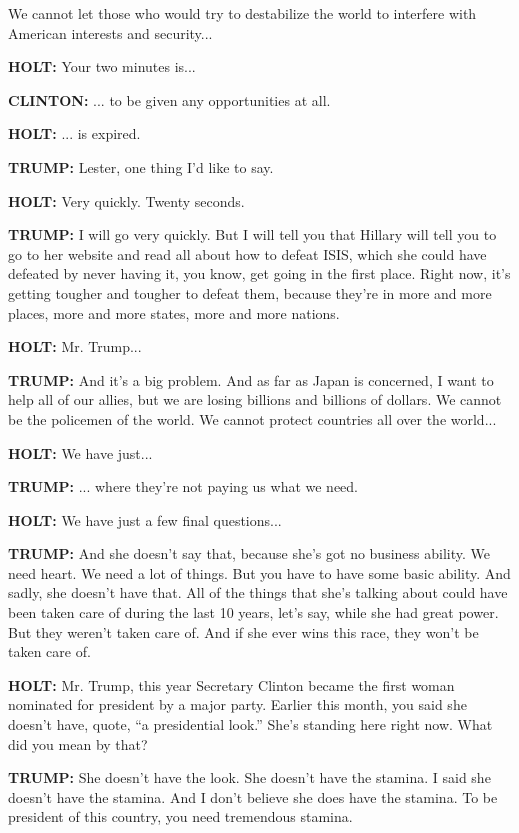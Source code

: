 We cannot let those who would try to destabilize the world to interfere
with American interests and security...

\textbf{HOLT:} Your two minutes is...

\textbf{CLINTON:} ... to be given any opportunities at all.

\textbf{HOLT:} ... is expired.

\textbf{TRUMP:} Lester, one thing I'd like to say.

\textbf{HOLT:} Very quickly. Twenty seconds.

\textbf{TRUMP:} I will go very quickly. But I will tell you that Hillary
will tell you to go to her website and read all about how to defeat
ISIS, which she could have defeated by never having it, you know, get
going in the first place. Right now, it's getting tougher and tougher to
defeat them, because they're in more and more places, more and more
states, more and more nations.

\textbf{HOLT:} Mr. Trump...

\textbf{TRUMP:} And it's a big problem. And as far as Japan is
concerned, I want to help all of our allies, but we are losing billions
and billions of dollars. We cannot be the policemen of the world. We
cannot protect countries all over the world...

\textbf{HOLT:} We have just...

\textbf{TRUMP:} ... where they're not paying us what we need.

\textbf{HOLT:} We have just a few final questions...

\textbf{TRUMP:} And she doesn't say that, because she's got no business
ability. We need heart. We need a lot of things. But you have to have
some basic ability. And sadly, she doesn't have that. All of the things
that she's talking about could have been taken care of during the last
10 years, let's say, while she had great power. But they weren't taken
care of. And if she ever wins this race, they won't be taken care of.

\textbf{HOLT:} Mr. Trump, this year Secretary Clinton became the first
woman nominated for president by a major party. Earlier this month, you
said she doesn't have, quote, ``a presidential look.'' She's standing
here right now. What did you mean by that?

\textbf{TRUMP:} She doesn't have the look. She doesn't have the stamina.
I said she doesn't have the stamina. And I don't believe she does have
the stamina. To be president of this country, you need tremendous
stamina.

